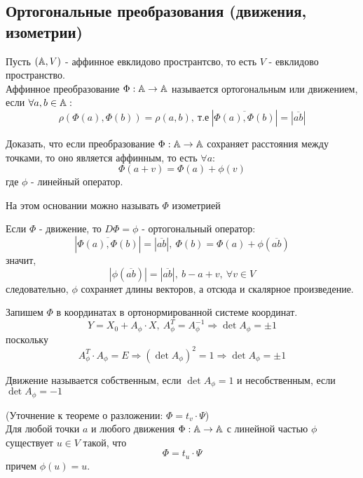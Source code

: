 \subsection{Ортогональные преобразования (движения, изометрии)}
\begin{definition}
    Пусть $(\mathbb{A},V)$ - аффинное евклидово пространтсво, то есть $V$ - евклидово пространство.\\
    Аффинное преобразование $\Phi: \mathbb{A}\to \mathbb{A}$ называется ортогональным или движением, если $\forall a,b\in \mathbb{A}:$
    \[\rho(\Phi(a),\Phi(b))=\rho(a,b),\ \text{т.е}\ |\overline{\Phi(a),\Phi(b)}|=|\overline{ab}|\]
\end{definition} 
\begin{exercise}
    Доказать, что если преобразование $\Phi: \mathbb{A}\to \mathbb{A}$ сохраняет расстояния между точками, то оно является аффинным, то есть $\forall a:$
    \[\Phi(a+v)=\Phi(a)+\phi(v)\]
    где $\phi$ - линейный оператор.
\end{exercise}
На этом основании можно называть $\Phi$ изометрией
\begin{remark}
    Если $\Phi$ - движение, то $D\Phi=\phi$ - ортогональный оператор:
    \[|\overline{\Phi(a),\Phi(b)}|=|\overline{ab}|,\ \Phi(b)=\Phi(a)+\phi(\overline{ab})\]
    значит,
    \[|\phi(\overline{ab})|=|\overline{ab}|,\ b-a+v,\ \forall v\in V\]
    следовательно, $\phi$ сохраняет длины векторов, а отсюда и скалярное произведение.
\end{remark}
Запишем $\Phi$ в координатах в ортонормированной системе координат.
\[Y=X_0+A_{\phi}\cdot X,\ A_{\phi}^T=A_{\phi}^{-1} \Longrightarrow \det{A_{\phi}}=\pm 1\]
поскольку
\[A_{\phi}^T\cdot A_{\phi}=E \Longrightarrow (\det{A_{\phi}})^2=1 \Longrightarrow \det{A_{\phi}}=\pm 1\]
\begin{definition}
    Движение называется собственным, если $\det{A_{\phi}}=1$ и несобственным, если $\det{A_{\phi}}=-1$
\end{definition} 
\begin{remark}
    (Уточнение к теореме о разложении: $\Phi=t_v\cdot\Psi$)\\
    Для любой точки $a$ и любого движения $\Phi:\mathbb{A}\to \mathbb{A}$ с линейной частью $\phi$ существует $u\in V$ такой, что
    \[\Phi=t_u\cdot \Psi\]
    причем $\phi(u)=u$.
\end{remark}
